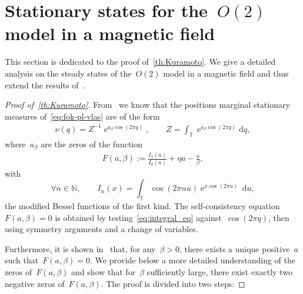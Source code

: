 \documentclass[onefignum,onetabnum]{siamart251216} %
\DeclareMathOperator{\e}{e}
\renewcommand{\d}{\mathrm{d}}
\newcommand{\torus}{\mathbb T}
\renewcommand{\leq}{\leqslant}
\theoremstyle{plain}
\numberwithin{equation}{section}
\numberwithin{theorem}{section}
\begin{document}
\section{Stationary states for the~$O(2)$ model in a magnetic field}
\label{sec:kuramoto}
This section is dedicated to the proof of~\cref{th:Kuramoto}. We give a detailed analysis on the steady states of the~$O(2)$ model in a magnetic field and thus extend the results of~\cite[Lemma 1.26]{delgadino2021diffusive}.
\begin{proof}[Proof of~{\cref{th:Kuramoto}}]
    From~\cite[Lemma 1.26]{delgadino2021diffusive} we know that the positions marginal stationary measures of~\eqref{eq:fok-pl-vlas} are of the form
    \begin{align}
        \label{eq:integral_eq}
        \nu(q)=Z^{-1}\e^{a_\beta \cos(2\pi q)},\qquad Z = \int_{\torus}\e^{a_\beta \cos(2\pi q)}\!\d q,
    \end{align}
    where~$a_\beta$ are the zeros of the function
    \begin{align}
        \label{eq:def_function_F}
        F(a,\beta) := \frac{I_1(a)}{I_0(a)} + \eta a - \frac{a}{\beta},
    \end{align}
    with
    \[
    \forall n \in \mathbb{N},\qquad I_n(x) = \int_{\torus}\cos(2\pi n u)\e^{x\cos(2\pi u)}\,\d u,
    \]
    the modified Bessel functions of the first kind.
    The self-consistency equation~$F(a,\beta)=0$ is obtained by testing~\eqref{eq:integral_eq} against~$\cos(2\pi q)$,
    then using symmetry arguments and a change of variables.

     Furthermore, it is shown in~\cite[Lemma 1.26]{delgadino2021diffusive} that, for any~$\beta > 0$, there exists a unique positive~$a$ such that~$F(a,\beta) = 0$.
     We provide below a more detailed understanding of the zeros of~$F(a,\beta)$ and show that for~$\beta$ sufficiently large, there exist exactly two negative zeros of~$F(a,\beta)$.
     The proof is divided into two steps:


\end{proof}
\end{document}
